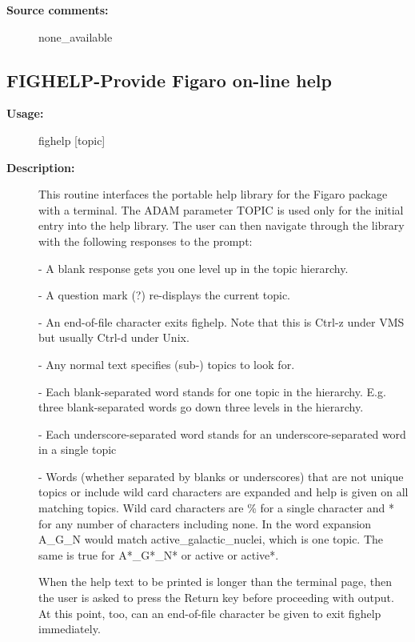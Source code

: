 \begin{description}
\begin{description}
\item [\textbf{Source comments:}]
\begin{terminalv}
  none_available

\end{terminalv}
\end{description}
\subsection{FIGHELP-\label{FIGHELP}Provide Figaro on-line help}
\begin{description}

\item [\textbf{Usage:}]
 fighelp [topic]

\item [\textbf{Description:}]
 This routine interfaces the portable help library for the Figaro
 package with a terminal. The ADAM parameter TOPIC is used only for
 the initial entry into the help library. The user can then
 navigate through the library with the following responses to the
 prompt:

   -  A blank response gets you one level up in the topic hierarchy.

   -  A question mark (?) re-displays the current topic.

   -  An end-of-file character exits fighelp. Note that this is
      Ctrl-z under VMS but usually Ctrl-d under Unix.

   -  Any normal text specifies (sub-) topics to look for.

   -  Each blank-separated word stands for one topic in the
      hierarchy. E.g. three blank-separated words go down three
      levels in the hierarchy.

   -  Each underscore-separated word stands for an
      underscore-separated word in a single topic

   -  Words (whether separated by blanks or underscores) that are not
      unique topics or include wild card characters are expanded and
      help is given on all matching topics. Wild card characters are
      \% for a single character and * for any number of characters
      including none. In the word expansion A\_G\_N would match
      active\_galactic\_nuclei, which is one topic. The same is true
      for A*\_G*\_N* or active or active*.

 When the help text to be printed is longer than the terminal page,
 then the user is asked to press the Return key before proceeding
 with output. At this point, too, can an end-of-file character be
 given to exit fighelp immediately.


\end{description}
\end{description}

